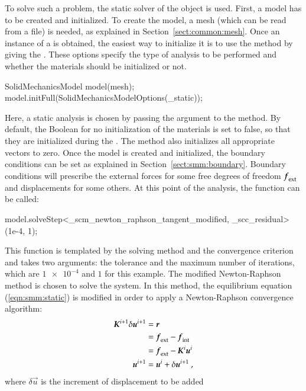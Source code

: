 To solve such a problem, the static solver of the
 object is used.
First, a model has to be created and initialized.  To create the
model, a mesh (which can be read from a file) is needed, as explained
in Section~\ref{sect:common:mesh}.  Once an instance of a
 is obtained, the easiest way to initialize
it is to use the 
method by giving the . These options
specify the type of analysis to be performed and whether the materials
should be initialized or not.
\begin{cpp}
SolidMechanicsModel model(mesh);
model.initFull(SolidMechanicsModelOptions(_static));
\end{cpp}
Here, a static analysis is chosen by passing the argument
 to the method. By default, the Boolean for no
initialization of the materials is set to false, so that they are
initialized during the . The method 
also initializes all appropriate vectors to zero.  Once the model is
created and initialized, the boundary conditions can be set as
explained in Section~\ref{sect:smm:boundary}.  Boundary conditions
will prescribe the external forces for some free degrees of freedom
$\boldsymbol{f}_{{\mathrm{ext}}}$ and displacements for some others.  At this point
of the analysis, the function
 can be called:
\begin{cpp}
model.solveStep<_scm_newton_raphson_tangent_modified, _scc_residual>(1e-4, 1);
\end{cpp}
This function is templated by the solving method and the convergence
criterion and takes two arguments: the tolerance and the maximum
number of iterations, which are $\num{1e-4}$ and $1$ for this example. The
modified Newton-Raphson method is chosen to solve the system. In this
method, the equilibrium equation (\ref{eqn:smm:static}) is modified in
order to apply a Newton-Raphson convergence algorithm:
\begin{align}\label{eqn:smm:static-newton-raphson}
  \boldsymbol{K}^{i+1}\delta\boldsymbol{u}^{i+1} &= \boldsymbol{r} \\
  &= \boldsymbol{f}_{{\mathrm{ext}}} -\boldsymbol{f}_{{\mathrm{int}}}\\
  &= \boldsymbol{f}_{{\mathrm{ext}}} - \boldsymbol{K}^{i} \boldsymbol{u}^{i}\\
  \boldsymbol{u}^{i+1} &= \boldsymbol{u}^{i} + \delta\boldsymbol{u}^{i+1}~,\nonumber
\end{align}
where $\delta\vec{u}$ is the increment of displacement to be added

